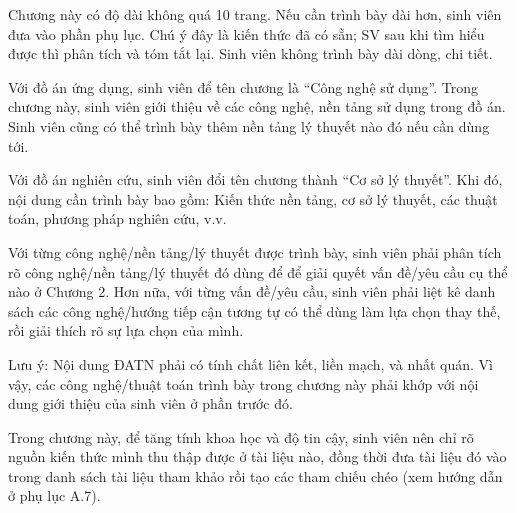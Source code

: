 \documentclass[../Main.tex]{subfiles}
\begin{document}
Chương này có độ dài không quá 10 trang. Nếu cần trình bày dài hơn, sinh viên đưa vào phần phụ lục. Chú ý đây là kiến thức đã có sẵn; SV sau khi tìm hiểu được thì phân tích và tóm tắt lại. Sinh viên không trình bày dài dòng, chi tiết. 

Với đồ án ứng dụng, sinh viên để tên chương là “Công nghệ sử dụng”. Trong chương này, sinh viên giới thiệu về các công nghệ, nền tảng sử dụng trong đồ án. Sinh viên cũng có thể trình bày thêm nền tảng lý thuyết nào đó nếu cần dùng tới.

Với đồ án nghiên cứu, sinh viên đổi tên chương thành “Cơ sở lý thuyết”. Khi đó, nội dung cần trình bày bao gồm: Kiến thức nền tảng, cơ sở lý thuyết, các thuật toán, phương pháp nghiên cứu, v.v.

Với từng công nghệ/nền tảng/lý thuyết được trình bày, sinh viên phải phân tích rõ công nghệ/nền tảng/lý thuyết đó dùng để để giải quyết vấn đề/yêu cầu cụ thể nào ở Chương 2. Hơn nữa, với từng vấn đề/yêu cầu, sinh viên phải liệt kê danh sách các công nghệ/hướng tiếp cận tương tự có thể dùng làm lựa chọn thay thế, rồi giải thích rõ sự lựa chọn của mình.

Lưu ý: Nội dung ĐATN phải có tính chất liên kết, liền mạch, và nhất quán. Vì vậy, các công nghệ/thuật toán trình bày trong chương này phải khớp với nội dung giới thiệu của sinh viên ở phần trước đó. 

Trong chương này, để tăng tính khoa học và độ tin cậy, sinh viên nên chỉ rõ nguồn kiến thức mình thu thập được ở tài liệu nào, đồng thời đưa tài liệu đó vào trong danh sách tài liệu tham khảo rồi tạo các tham chiếu chéo (xem hướng dẫn ở phụ lục A.7).
\end{document}
